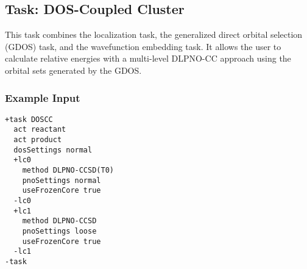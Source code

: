 \subsection{Task: DOS-Coupled Cluster}
This task combines the localization task, the generalized direct orbital selection (GDOS)
task, and the wavefunction embedding task. It allows the user to calculate relative energies
with a multi-level DLPNO-CC approach using the orbital sets generated by the GDOS.
\subsubsection{Example Input}
\begin{lstlisting}
+task DOSCC
  act reactant
  act product
  dosSettings normal
  +lc0
    method DLPNO-CCSD(T0)
    pnoSettings normal
    useFrozenCore true
  -lc0
  +lc1
    method DLPNO-CCSD
    pnoSettings loose
    useFrozenCore true
  -lc1
-task
\end{lstlisting}
